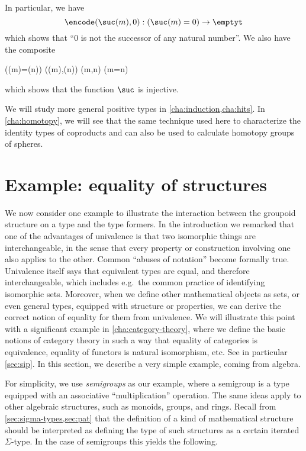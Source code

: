 In particular, we have
\begin{equation}\label{eq:zero-not-succ}
  \encode(\suc(m),0) : (\suc(m)=0) \to \emptyt
\end{equation}
which shows that ``$0$ is not the successor of any natural number''.
We also have the composite
\begin{narrowmultline}\label{eq:suc-injective}
  (\suc(m)=\suc(n))
  \xrightarrow{\encode} \narrowbreak
  \code(\suc(m),\suc(n))
  \jdeq \code(m,n) \xrightarrow{\decode} (m=n)
\end{narrowmultline}
which shows that the function $\suc$ is injective.
%

We will study more general positive types in \cref{cha:induction,cha:hits}.
In \cref{cha:homotopy}, we will see that the same technique used here to characterize the identity types of coproducts and \nat can also be used to calculate homotopy groups of spheres.

%
%

\section{Example: equality of structures}
\label{sec:equality-of-structures}

We now consider one example to illustrate the interaction between the groupoid structure on a type and the type
formers.  In the introduction we remarked that one of the
advantages of univalence is that two isomorphic things are interchangeable,
in the sense that every property or construction involving one also
applies to the other.  Common ``abuses of notation'' become formally
true.  Univalence itself says that equivalent types are equal, and
therefore interchangeable, which includes e.g.\  the common practice of identifying isomorphic sets.  Moreover, when we define other
mathematical objects as sets, or even general types, equipped with structure or properties, we
can derive the correct notion of equality for them from univalence.  We will illustrate this
point with a significant example in \cref{cha:category-theory}, where we
define the basic notions of category theory in such a way that equality
of categories is equivalence, equality of functors is natural
isomorphism, etc. See in particular \cref{sec:sip}.
 In this section, we describe a very simple example, coming from algebra.

For simplicity, we use \emph{semigroups} as our example, where a
semigroup is a type equipped with an associative ``multiplication''
operation.  The same ideas apply to other algebraic structures, such as
monoids, groups, and rings.
Recall from \cref{sec:sigma-types,sec:pat} that the definition of a kind of mathematical structure should be interpreted as defining the type of such structures as a certain iterated $\Sigma$-type.
In the case of semigroups this yields the following.

